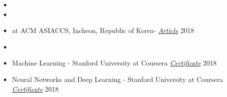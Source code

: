 
\begin{itemize}[noitemsep,topsep=0pt]
	\item {}
	\item {}
	\item {} at ACM ASIACCS, Incheon, Republic of Korea- \href{https://www.bu.edu/eng/2018/08/14/best-paper-award-asia-conference-on-computer-and-communication-security-2018/}{ \textit{Article}} 2018
	\item {}
	\item Machine Learning - Stanford University at Coursera  \href{https://www.coursera.org/account/accomplishments/verify/U5YHWN3XSAQU}{\textit{Certificate}} 2018
	\item Neural Networks and Deep Learning - Stanford University at Coursera \href{https://www.coursera.org/account/accomplishments/verify/ZU26W977NR9P}{\textit{Certificate}} 2018\\
\end{itemize}